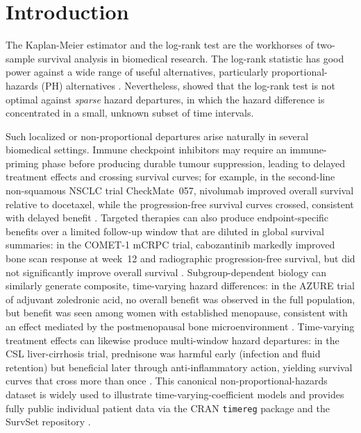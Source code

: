 \documentclass[unnumsec,webpdf,contemporary,large]{oup-authoring-template}
\begin{document}

\maketitle


\section{Introduction}

The Kaplan-Meier estimator \citep{kaplan1958} and the log-rank test
\citep{mantel1966} are the workhorses of two-sample survival analysis in
biomedical research. The log-rank statistic has good power against a wide
range of useful alternatives, particularly proportional-hazards (PH)
alternatives \citep{schoenfeld1981}. Nevertheless,
\citet{kipnis_biometrika} showed that the log-rank test is not optimal
against \emph{sparse} hazard departures, in which the hazard difference is
concentrated in a small, unknown subset of time intervals.

Such localized or non-proportional departures arise naturally in several
biomedical settings. Immune checkpoint inhibitors may require an
immune-priming phase before producing durable tumour suppression, leading
to delayed treatment effects and crossing survival curves; for example,
in the second-line non-squamous NSCLC trial CheckMate~057, nivolumab
improved overall survival relative to docetaxel, while the
progression-free survival curves crossed, consistent with delayed benefit
\citep{borghaei2015}. Targeted therapies can also produce endpoint-specific
benefits over a limited follow-up window that are diluted in global
survival summaries: in the COMET-1 mCRPC trial, cabozantinib markedly
improved bone scan response at week~12 and radiographic
progression-free survival, but did not significantly improve overall
survival \citep{smith2016}. Subgroup-dependent biology can similarly
generate composite, time-varying hazard differences: in the AZURE trial
of adjuvant zoledronic acid, no overall benefit was observed in the full
population, but benefit was seen among women with established menopause,
consistent with an effect mediated by the postmenopausal bone
microenvironment \citep{coleman2011,coleman2014}.
Time-varying treatment effects can likewise produce multi-window hazard
departures: in the CSL liver-cirrhosis trial, prednisone was harmful early
(infection and fluid retention) but beneficial later through
anti-inflammatory action, yielding survival curves that cross more than once
\citep{csl_data}. This canonical non-proportional-hazards dataset is widely
used to illustrate time-varying-coefficient models and provides fully public
individual patient data via the CRAN \texttt{timereg} package
\citep{csl_data} and the SurvSet repository \citep{survset2022}.
\end{document}
